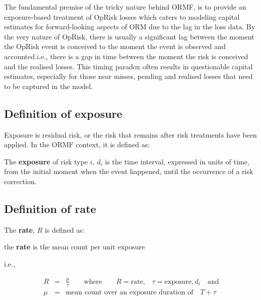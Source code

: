 \documentclass[]{DissertateUSU}
\begin{document}
The fundamental premise of the tricky nature behind ORMF, is to provide
an exposure-based treatment of OpRisk losses which caters to modeling
capital estimates for forward-looking aspects of ORM due to the lag in
the loss data. By the very nature of OpRisk, there is usually a
significant lag between the moment the OpRisk event is conceived to the
moment the event is observed and accounted.i.e., there is a gap in time
between the moment the risk is conceived and the realised losses. This
timing paradox often results in questionable capital estimates,
especially for those near misses, pending and realised losses that need
to be captured in the model.\medskip

\subsection{Definition of exposure}
\label{ssec:Definition of exposure}

Exposure is residual risk, or the risk that remains after risk
treatments have been applied. In the ORMF context, it is defined as:

\begin{definition}
The  \textbf{exposure} of risk type $i$, $d_{i}$ is the time interval, expressed in units of time, from the initial moment when the event happened, until the occurrence of a risk correction.
\end{definition}

\subsection{Definition of rate}
\label{ssec:Definition of rate}

The \textbf{rate}, \(R\) is defined as:\medskip

\begin{definition}
the \textbf{rate} is the mean count per unit exposure
\end{definition}

i.e.,

\singlespacing

\begin{eqnarray}
R &=& \frac{\mu}{\tau} \qquad \mbox{where} \qquad R = \mbox{rate,} \quad \tau = \mbox{exposure},d_{i}\quad \mbox{and}\nonumber\\
\mu &=& \mbox{mean count over an exposure duration of} \quad T+\tau \nonumber
\end{eqnarray}

\doublespacing
\end{document}
